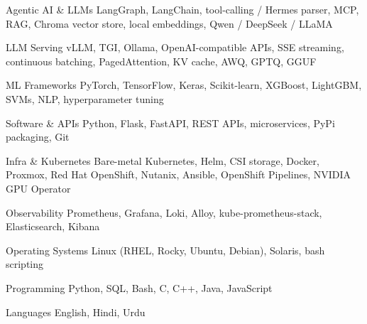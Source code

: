 

\begin{cvskills}
	\cvskill
{Agentic AI \& LLMs} %
{LangGraph, LangChain, tool-calling / Hermes parser, MCP, RAG, Chroma vector store, local embeddings, Qwen / DeepSeek / LLaMA} %

\cvskill
{LLM Serving} %
{vLLM, TGI, Ollama, OpenAI-compatible APIs, SSE streaming, continuous batching, PagedAttention, KV cache, AWQ, GPTQ, GGUF} %

\cvskill
{ML Frameworks} %
{PyTorch, TensorFlow, Keras, Scikit-learn, XGBoost, LightGBM, SVMs, NLP, hyperparameter tuning} %

\cvskill
{Software \& APIs} %
{Python, Flask, FastAPI, REST APIs, microservices, PyPi packaging, Git} %

\cvskill
{Infra \& Kubernetes} %
{Bare-metal Kubernetes, Helm, CSI storage, Docker, Proxmox, Red Hat OpenShift, Nutanix, Ansible, OpenShift Pipelines, NVIDIA GPU Operator} %

\cvskill
{Observability} %
{Prometheus, Grafana, Loki, Alloy, kube-prometheus-stack, Elasticsearch, Kibana} %

\cvskill
{Operating Systems} %
{Linux (RHEL, Rocky, Ubuntu, Debian), Solaris, bash scripting} %

\cvskill
{Programming} %
{Python, SQL, Bash, C, C++, Java, JavaScript} %

\cvskill
{Languages} %
{English, Hindi, Urdu} %


\end{cvskills}
